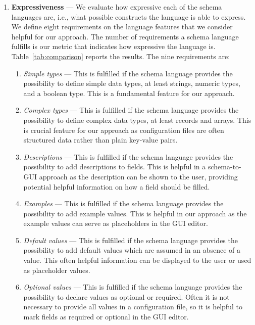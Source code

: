 \begin{enumerate}
\begin{enumerate}
    \end{enumerate}

    \item \textbf{Expressiveness} --- We evaluate how expressive each of the schema languages are, i.e., what possible constructs the language is able to express.
    We define eight requirements on the language features that we consider helpful for our approach.
    The number of requirements a schema language fulfills is our metric that indicates how expressive the language is.
    Table~\ref{tab:comparison} reports the results.
    The nine requirements are:
    \begin{enumerate}
        \item \textit{Simple types} --- This is fulfilled if the schema language provides the possibility to define simple data types, at least strings, numeric types, and a boolean type.
        This is a fundamental feature for our approach.
        \item \textit{Complex types} --- This is fulfilled if the schema language provides the possibility to define complex data types, at least records and arrays.
        This is crucial feature for our approach as configuration files are often structured data rather than plain key-value pairs.
        \item \textit{Descriptions} --- This is fulfilled if the schema language provides the possibility to add descriptions to fields.
        This is helpful in a schema-to-GUI approach as the description can be shown to the user, providing potential helpful information on how a field should be filled.
        \item \textit{Examples} --- This is fulfilled if the schema language provides the possibility to add example values.
        This is helpful in our approach as the example values can serve as placeholders in the GUI editor.
        \item \textit{Default values} --- This is fulfilled if the schema language provides the possibility to add default values which are assumed in an absence of a value.
        This often helpful information can be displayed to the user or used as placeholder values.
        \item \textit{Optional values} --- This is fulfilled if the schema language provides the possibility to declare values as optional or required.
        Often it is not necessary to provide all values in a configuration file, so it is helpful to mark fields as required or optional in the GUI editor.

\end{enumerate}
\end{enumerate}
